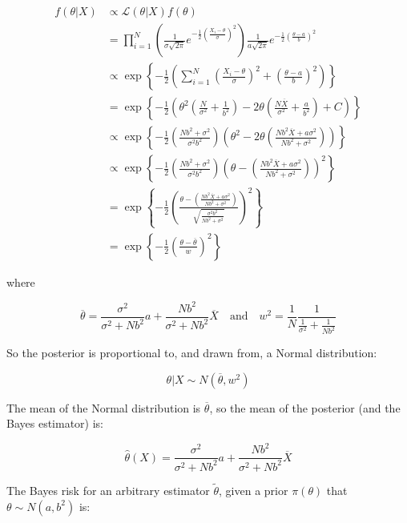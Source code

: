 \begin{align}
f(\theta | X) &\propto \mathcal{L}(\theta | X) f(\theta) \\
&= \prod_{i = 1}^N \left( \frac{1}{\sigma \sqrt{2 \pi}} e^{-\frac{1}{2} \left(\frac{X_i - \theta}{\sigma} \right)^2} \right) \frac{1}{a \sqrt{2 \pi}} e^{-\frac{1}{2} \left( \frac{\theta - a}{b}\right)^2} \\
& \propto \exp \left\{ -\frac{1}{2} \left( \sum_{i=1}^N \left( \frac{X_i - \theta}{\sigma}\right)^2 + \left( \frac{\theta - a}{b}\right)^2 \right) \right\} \\
& = \exp \left\{-\frac{1}{2} \left( \theta^2 \left(\frac{N}{\sigma^2} + \frac{1}{b^2} \right) - 2 \theta \left( \frac{N \overline{X}}{\sigma^2} + \frac{a}{b^2} \right) + C\right) \right\} \\
& \propto \exp \left\{-\frac{1}{2} \left( \frac{Nb^2 + \sigma^2}{\sigma^2 b^2} \right)\left(\theta^2 - 2\theta \left(\frac{N b^2 \overline{X} + a \sigma^2}{N b^2 + \sigma^2} \right) \right) \right\} \\
& \propto \exp \left\{-\frac{1}{2} \left( \frac{Nb^2 + \sigma^2}{\sigma^2 b^2} \right) \left(\theta - \left(\frac{N b^2 \overline{X} + a \sigma^2}{N b^2 + \sigma^2} \right) \right)^2 \right\} \\
& = \exp \left\{-\frac{1}{2} \left(\frac{\theta - \left(\frac{N b^2 \overline{X} + a \sigma^2}{N b^2 + \sigma^2} \right)}{\sqrt{\frac{\sigma^2 b^2}{Nb^2 + \sigma^2}}} \right)^2 \right\} \\
& = \exp \left\{-\frac{1}{2} \left(\frac{\theta - \overline{\theta}}{w} \right)^2 \right\}
\end{align}

where

\[
\overline{\theta} = \frac{\sigma^2}{\sigma^2 + N b^2}a + \frac{Nb^2}{\sigma^2 + Nb^2}\overline{X}
\quad \text{and} \quad
w^2 = \frac{1}{N} \frac{1}{\frac{1}{\sigma^2} + \frac{1}{Nb^2}}
\]

So the posterior is proportional to, and drawn from, a Normal
distribution:

\[ \theta | X \sim N(\overline{\theta}, w^2) \]

The mean of the Normal distribution is \(\overline{\theta}\), so the
mean of the posterior (and the Bayes estimator) is:

\[ \hat{\theta}(X) = \frac{\sigma^2}{\sigma^2 + N b^2}a + \frac{Nb^2}{\sigma^2 + Nb^2}\overline{X}\]

The Bayes risk for an arbitrary estimator \(\tilde{\theta}\), given a
prior \(\pi(\theta)\) that \(\theta \sim N(a, b^2)\) is:

